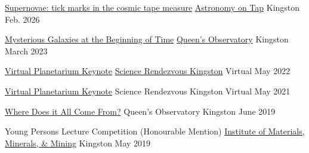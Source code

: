 \begin{cvhonors}

  \cvhonor
    {\href{https://docs.google.com/presentation/d/1hAMIzrWUPJpDpMneis3PH1kJALigWQwAiJvW9ml72tc/edit?usp=sharing}{Supernovae: tick marks in the cosmic tape measure}} %
    {\href{https://astronomyontap.org/event/astronomy-on-tap-kingston-10/}{Astronomy on Tap}} %
    {Kingston} %
    {Feb. 2026} %

  \cvhonor
    {\href{https://docs.google.com/presentation/d/13COYyj7_FUXmirivS_m8cui-MgdozzANVy8Y7UjahUc/edit?usp=sharing}{Mysterious Galaxies at the Beginning of Time}} %
    {\href{https://www.queensu.ca/observatory/}{Queen's Observatory}} %
    {Kingston} %
    {March 2023} %
    
  \cvhonor
    {\href{https://www.youtube.com/watch?v=zHVvWDvsoVA}{Virtual Planetarium Keynote}} %
    {\href{https://educ.queensu.ca/sites/educwww/files/uploaded_files/Community/COC/astronomy.pdf}{Science Rendezvous Kingston}} %
    {Virtual} %
    {May 2022} %
    
  \cvhonor
    {\href{https://ygksciencerendezvous.expofp.com/?connor-stone}{Virtual Planetarium Keynote}} %
    {Science Rendezvous Kingston} %
    {Virtual} %
    {May 2021} %
    
  \cvhonor
    {\href{https://www.youtube.com/watch?v=W5KTiz5g7vY&t=726s}{Where Does it All Come From?}} %
    {Queen's Observatory} %
    {Kingston} %
    {June 2019} %
    
  \cvhonor
    {Young Persons Lecture Competition (Honourable Mention)} %
    {\href{https://www.iom3.org/events-awards/competitions/yplc.html}{Institute of Materials, Minerals, \& Mining}} %
    {Kingston} %
    {May 2019} %
        

\end{cvhonors}
